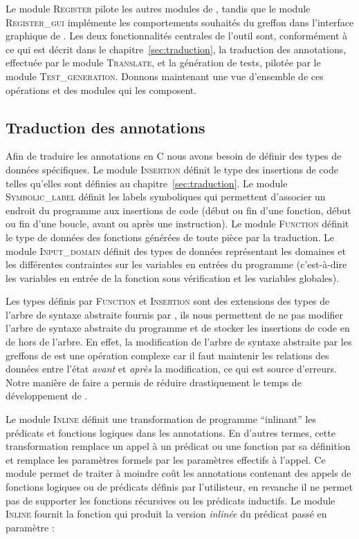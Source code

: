 Le module \textsc{Register} pilote les autres modules de \stady, tandis que le
module \textsc{Register\_gui} implémente les comportements souhaités du greffon
dans l'interface graphique de \framac.
Les deux fonctionnalités centrales de l'outil sont, conformément à ce qui est
décrit dans le chapitre~\ref{sec:traduction}, la traduction des annotations,
effectuée par le module \textsc{Translate}, et la génération de tests, pilotée
par le module \textsc{Test\_generation}.
Donnons maintenant une vue d'ensemble de ces opérations et des modules qui les
composent.


\subsection{Traduction des annotations}


Afin de traduire les annotations \eacsl en C nous avons besoin de définir des
types de données spécifiques.
Le module \textsc{Insertion} définit le type des insertions de code telles
qu'elles sont définies au chapitre~\ref{sec:traduction}.
Le module \textsc{Symbolic\_label} définit les labels symboliques qui permettent
d'associer un endroit du programme aux insertions de code (début ou fin d'une
fonction, début ou fin d'une boucle, avant ou après une instruction).
Le module \textsc{Function} définit le type de données des fonctions générées
de toute pièce par la traduction.
Le module \textsc{Input\_domain} définit des types de données représentant les
domaines et les différentes contraintes sur les variables en entrées du
programme (c'est-à-dire les variables en entrée de la fonction sous vérification
et les variables globales).

Les types définis par \textsc{Function} et \textsc{Insertion} sont des
extensions des types de l'arbre de syntaxe abstraite fournis par \framac, ils
nous permettent de ne pas modifier l'arbre de syntaxe abstraite du programme et
de stocker les insertions de code en de hors de l'arbre.
En effet, la modification de l'arbre de syntaxe abstraite par les greffons de
\framac est une opération complexe car il faut maintenir les relations
des données entre l'état {\em avant} et {\em après} la modification, ce qui est
source d'erreurs.
Notre manière de faire a permis de réduire drastiquement le temps de
développement de \stady.

Le module \textsc{Inline} définit une transformation de programme ``inlinant''
les prédicats et fonctions logiques dans les annotations.
En d'autres termes, cette transformation remplace un appel à un prédicat ou une
fonction par sa définition et remplace les paramètres formels par les paramètres
effectifs à l'appel.
Ce module permet de traiter à moindre coût les annotations contenant des appels
de fonctions logiques ou de prédicats définis par l'utilisteur, en revanche il
ne permet pas de supporter les fonctions récursives ou les prédicats inductifs.
Le module \textsc{Inline} fournit la fonction 
qui produit la version {\em inlinée} du prédicat passé en paramètre :

